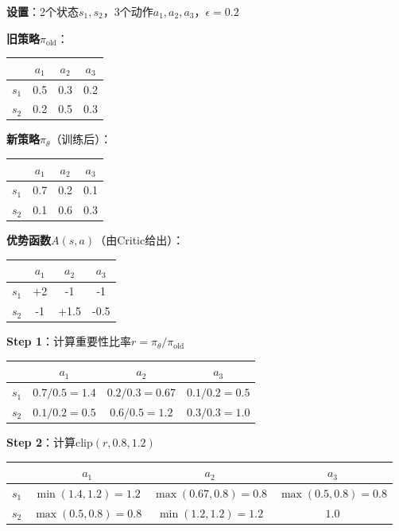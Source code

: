 \documentclass[11pt,a4paper]{article}
\theoremstyle{definition}
\begin{document}
\begin{calculation}
\textbf{设置}：2个状态$s_1, s_2$，3个动作$a_1, a_2, a_3$，$\epsilon = 0.2$

\textbf{旧策略}$\pi_{\text{old}}$：
\begin{center}
\begin{tabular}{c|ccc}
& $a_1$ & $a_2$ & $a_3$ \\
\hline
$s_1$ & 0.5 & 0.3 & 0.2 \\
$s_2$ & 0.2 & 0.5 & 0.3 \\
\end{tabular}
\end{center}

\textbf{新策略}$\pi_\theta$（训练后）：
\begin{center}
\begin{tabular}{c|ccc}
& $a_1$ & $a_2$ & $a_3$ \\
\hline
$s_1$ & 0.7 & 0.2 & 0.1 \\
$s_2$ & 0.1 & 0.6 & 0.3 \\
\end{tabular}
\end{center}

\textbf{优势函数}$A(s,a)$（由Critic给出）：
\begin{center}
\begin{tabular}{c|ccc}
& $a_1$ & $a_2$ & $a_3$ \\
\hline
$s_1$ & +2 & -1 & -1 \\
$s_2$ & -1 & +1.5 & -0.5 \\
\end{tabular}
\end{center}

\textbf{Step 1}：计算重要性比率$r = \pi_\theta / \pi_{\text{old}}$
\begin{center}
\begin{tabular}{c|ccc}
& $a_1$ & $a_2$ & $a_3$ \\
\hline
$s_1$ & $0.7/0.5=1.4$ & $0.2/0.3=0.67$ & $0.1/0.2=0.5$ \\
$s_2$ & $0.1/0.2=0.5$ & $0.6/0.5=1.2$ & $0.3/0.3=1.0$ \\
\end{tabular}
\end{center}

\textbf{Step 2}：计算$\text{clip}(r, 0.8, 1.2)$
\begin{center}
\begin{tabular}{c|ccc}
& $a_1$ & $a_2$ & $a_3$ \\
\hline
$s_1$ & $\min(1.4, 1.2)=1.2$ & $\max(0.67, 0.8)=0.8$ & $\max(0.5, 0.8)=0.8$ \\
$s_2$ & $\max(0.5, 0.8)=0.8$ & $\min(1.2, 1.2)=1.2$ & $1.0$ \\
\end{tabular}
\end{center}


\end{calculation}
\end{document}
